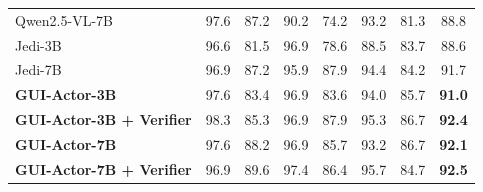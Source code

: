 \begin{table}[h]
{\begin{tabular}{lccccccc}
Qwen2.5-VL-7B & 97.6 & 87.2 & 90.2 & 74.2 & 93.2 & 81.3 & \cellcolor{lightblue}88.8 \\
Jedi-3B & 96.6 & 81.5 & 96.9 & 78.6 & 88.5 & 83.7 & \cellcolor{lightblue}88.6 \\
Jedi-7B & 96.9 & 87.2 & 95.9 & 87.9 & 94.4 & 84.2 & \cellcolor{lightblue}91.7 \\
\cellcolor{lightblue}\textbf{GUI-Actor-3B} & \cellcolor{lightblue}97.6 & \cellcolor{lightblue}83.4 & \cellcolor{lightblue}96.9 & \cellcolor{lightblue}83.6 & \cellcolor{lightblue}94.0 & \cellcolor{lightblue}85.7 & \cellcolor{lightblue}\textbf{91.0} \\
\cellcolor{lightblue}\textbf{GUI-Actor-3B + Verifier} & \cellcolor{lightblue}98.3 & \cellcolor{lightblue}85.3 & \cellcolor{lightblue}96.9 & \cellcolor{lightblue}87.9 & \cellcolor{lightblue}95.3 & \cellcolor{lightblue}86.7 & \cellcolor{lightblue}\textbf{92.4} \\
\cellcolor{lightblue}\textbf{GUI-Actor-7B} & \cellcolor{lightblue}97.6 & \cellcolor{lightblue}88.2 & \cellcolor{lightblue}96.9 & \cellcolor{lightblue}85.7 & \cellcolor{lightblue}93.2 & \cellcolor{lightblue}86.7 & \cellcolor{lightblue}\textbf{92.1} \\
\cellcolor{lightblue}\textbf{GUI-Actor-7B + Verifier} & \cellcolor{lightblue}96.9 & \cellcolor{lightblue}89.6 & \cellcolor{lightblue}97.4 & \cellcolor{lightblue}86.4 & \cellcolor{lightblue}95.7 & \cellcolor{lightblue}84.7 & \cellcolor{lightblue}\textbf{92.5} \\
\bottomrule
\end{tabular}

\vspace{-0.5em}
}
\label{tab:qwen25vl}
\end{table}

